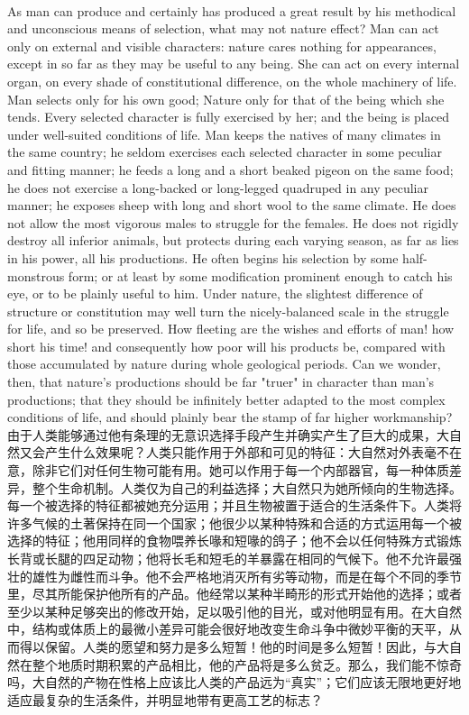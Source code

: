 \documentclass{article}
\begin{document}
\\
As man can produce and certainly has produced a great result by his methodical and unconscious means of selection, what may not nature effect? Man can act only on external and visible characters: nature cares nothing for appearances, except in so far as they may be useful to any being. She can act on every internal organ, on every shade of constitutional difference, on the whole machinery of life. Man selects only for his own good; Nature only for that of the being which she tends. Every selected character is fully exercised by her; and the being is placed under well-suited conditions of life. Man keeps the natives of many climates in the same country; he seldom exercises each selected character in some peculiar and fitting manner; he feeds a long and a short beaked pigeon on the same food; he does not exercise a long-backed or long-legged quadruped in any peculiar manner; he exposes sheep with long and short wool to the same climate. He does not allow the most vigorous males to struggle for the females. He does not rigidly destroy all inferior animals, but protects during each varying season, as far as lies in his power, all his productions. He often begins his selection by some half-monstrous form; or at least by some modification prominent enough to catch his eye, or to be plainly useful to him. Under nature, the slightest difference of structure or constitution may well turn the nicely-balanced scale in the struggle for life, and so be preserved. How fleeting are the wishes and efforts of man! how short his time! and consequently how poor will his products be, compared with those accumulated by nature during whole geological periods. Can we wonder, then, that nature's productions should be far "truer" in character than man's productions; that they should be infinitely better adapted to the most complex conditions of life, and should plainly bear the stamp of far higher workmanship?\\
由于人类能够通过他有条理的无意识选择手段产生并确实产生了巨大的成果，大自然又会产生什么效果呢？人类只能作用于外部和可见的特征：大自然对外表毫不在意，除非它们对任何生物可能有用。她可以作用于每一个内部器官，每一种体质差异，整个生命机制。人类仅为自己的利益选择；大自然只为她所倾向的生物选择。每一个被选择的特征都被她充分运用；并且生物被置于适合的生活条件下。人类将许多气候的土著保持在同一个国家；他很少以某种特殊和合适的方式运用每一个被选择的特征；他用同样的食物喂养长喙和短喙的鸽子；他不会以任何特殊方式锻炼长背或长腿的四足动物；他将长毛和短毛的羊暴露在相同的气候下。他不允许最强壮的雄性为雌性而斗争。他不会严格地消灭所有劣等动物，而是在每个不同的季节里，尽其所能保护他所有的产品。他经常以某种半畸形的形式开始他的选择；或者至少以某种足够突出的修改开始，足以吸引他的目光，或对他明显有用。在大自然中，结构或体质上的最微小差异可能会很好地改变生命斗争中微妙平衡的天平，从而得以保留。人类的愿望和努力是多么短暂！他的时间是多么短暂！因此，与大自然在整个地质时期积累的产品相比，他的产品将是多么贫乏。那么，我们能不惊奇吗，大自然的产物在性格上应该比人类的产品远为“真实”；它们应该无限地更好地适应最复杂的生活条件，并明显地带有更高工艺的标志？
\end{document}
